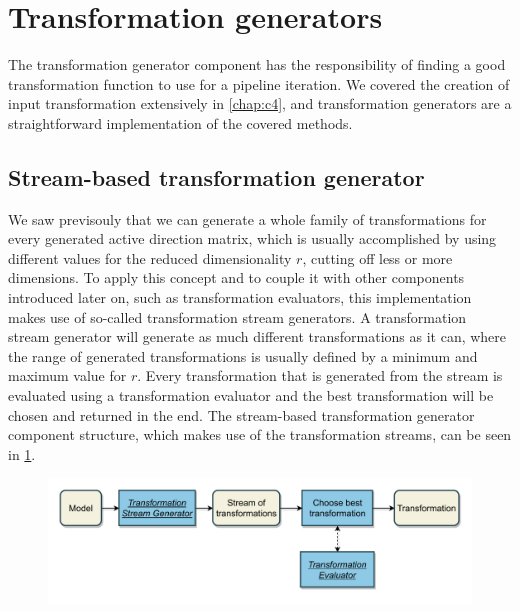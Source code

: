 \documentclass[
  a4paper,  %
  twoside,  %
  bibliography=totoc,
  headsepline,
  cleardoublepage=empty,
  parskip=half,
  draft=false
]{scrbook}
\begin{document}
\newpage
\section {Transformation generators}
\label{sec:tg}

The transformation generator component has the responsibility of finding a good transformation function to use for a pipeline iteration.
We covered the creation of input transformation extensively in \cref{chap:c4}, and transformation generators are a straightforward implementation of the covered methods.

\subsection {Stream-based transformation generator}
\label{sec:tsg}

We saw previsouly that we can generate a whole family of transformations for every generated active direction matrix, which is usually accomplished by using different values for the reduced dimensionality $r$, \ie cutting off less or more dimensions.
To apply this concept and to couple it with other components introduced later on, such as transformation evaluators, this implementation makes use of so-called transformation stream generators.
A transformation stream generator will generate as much different transformations as it can, where the range of generated transformations is usually defined by a minimum and maximum value for $r$.
Every transformation that is generated from the stream is evaluated using a transformation evaluator and the best transformation will be chosen and returned in the end.
The stream-based transformation generator component structure, which makes use of the transformation streams, can be seen in \cref{fig:tsg}.

\begin{mdframed}[style=style,frametitle={Transformation generator (stream-based)}]
\begin{figure}[H]
\includegraphics[width=\textwidth]{graphics/TransformationGen_Stream.pdf}
\delimit
{}
\label{fig:tsg}
\end{figure}
\end{mdframed}
\end{document}

